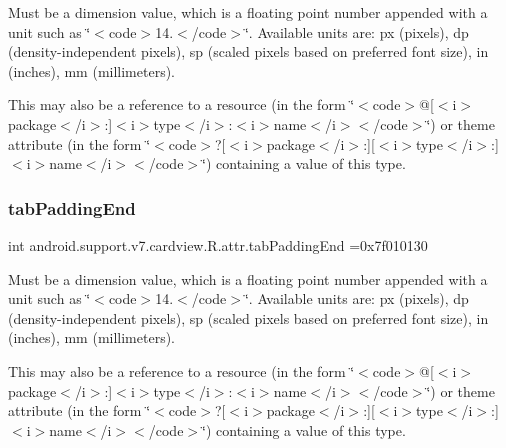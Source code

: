 Must be a dimension value, which is a floating point number appended with a unit such as \char`\"{}$<$code$>$14.\+5sp$<$/code$>$\char`\"{}. Available units are\+: px (pixels), dp (density-\/independent pixels), sp (scaled pixels based on preferred font size), in (inches), mm (millimeters). 

This may also be a reference to a resource (in the form \char`\"{}$<$code$>$@\mbox{[}$<$i$>$package$<$/i$>$\+:\mbox{]}$<$i$>$type$<$/i$>$\+:$<$i$>$name$<$/i$>$$<$/code$>$\char`\"{}) or theme attribute (in the form \char`\"{}$<$code$>$?\mbox{[}$<$i$>$package$<$/i$>$\+:\mbox{]}\mbox{[}$<$i$>$type$<$/i$>$\+:\mbox{]}$<$i$>$name$<$/i$>$$<$/code$>$\char`\"{}) containing a value of this type. \mbox{\label{classandroid_1_1support_1_1v7_1_1cardview_1_1R_1_1attr_a0c091ae5857b1f85a1f9bc1be7e4e8e6}} 
\subsubsection{\texorpdfstring{tab\+Padding\+End}{tabPaddingEnd}}
{\footnotesize\ttfamily int android.\+support.\+v7.\+cardview.\+R.\+attr.\+tab\+Padding\+End =0x7f010130\hspace{0.3cm}{\ttfamily [static]}}

Must be a dimension value, which is a floating point number appended with a unit such as \char`\"{}$<$code$>$14.\+5sp$<$/code$>$\char`\"{}. Available units are\+: px (pixels), dp (density-\/independent pixels), sp (scaled pixels based on preferred font size), in (inches), mm (millimeters). 

This may also be a reference to a resource (in the form \char`\"{}$<$code$>$@\mbox{[}$<$i$>$package$<$/i$>$\+:\mbox{]}$<$i$>$type$<$/i$>$\+:$<$i$>$name$<$/i$>$$<$/code$>$\char`\"{}) or theme attribute (in the form \char`\"{}$<$code$>$?\mbox{[}$<$i$>$package$<$/i$>$\+:\mbox{]}\mbox{[}$<$i$>$type$<$/i$>$\+:\mbox{]}$<$i$>$name$<$/i$>$$<$/code$>$\char`\"{}) containing a value of this type. \mbox{\label{classandroid_1_1support_1_1v7_1_1cardview_1_1R_1_1attr_a3421bca05bbfb8a54877854aa30829c0}} 
